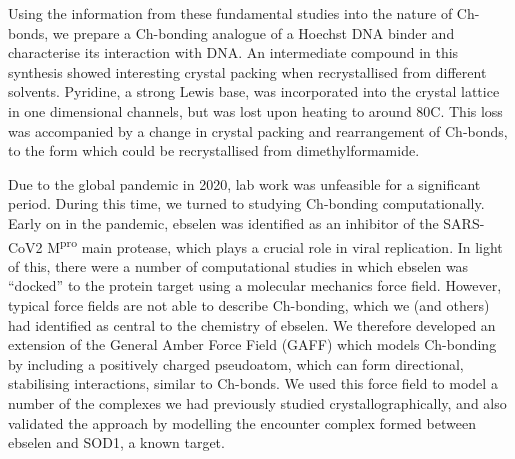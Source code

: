 \begin{refsection}
Using the information from these fundamental studies into the nature of Ch-bonds, we prepare a Ch-bonding analogue of a Hoechst DNA binder and characterise its interaction with DNA.
An intermediate compound in this synthesis showed interesting crystal packing when recrystallised from different solvents.
Pyridine, a strong Lewis base, was incorporated into the crystal lattice in one dimensional channels, but was lost upon heating to around 80\degree{}C.
This loss was accompanied by a change in crystal packing and rearrangement of Ch-bonds, to the form which could be recrystallised from dimethylformamide.

Due to the global pandemic in 2020, lab work was unfeasible for a significant period.
During this time, we turned to studying Ch-bonding computationally.
Early on in the pandemic, ebselen was identified as an inhibitor of the SARS-CoV2 M\textsuperscript{pro} main protease, which plays a crucial role in viral replication.\autocite{Jin2020}
In light of this, there were a number of computational studies in which ebselen was ``docked'' to the protein target using a molecular mechanics force field.
However, typical force fields are not able to describe Ch-bonding, which we (and others) had identified as central to the chemistry of ebselen.
We therefore developed an extension of the General Amber Force Field (GAFF) which models Ch-bonding by including a positively charged pseudoatom, which can form directional, stabilising interactions, similar to Ch-bonds.
We used this force field to model a number of the complexes we had previously studied crystallographically, and also validated the approach by modelling the encounter complex formed between ebselen and SOD1, a known target.


\printbibliography[heading=subbibliography]
\end{refsection}
